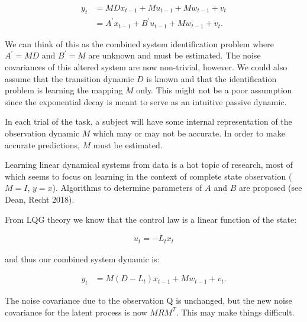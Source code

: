 {            \[
            \begin{align*}
            y_t &= MDx_{t-1} + Mu_{t-1} + Mw_{t-1} + v_t \\
            &= A^\prime x_{t-1} + B^\prime u_{t-1} + Mw_{t-1} + v_t.
            \end{align*}
            \]

            We can think of this as the combined system identification
            problem where \(A^\prime=MD\) and \(B^\prime=M\) are unknown
            and must be estimated. The noise covariances of this altered
            system are now non-trivial, however. We could also assume
            that the transition dynamic \(D\) is known and that the
            identification problem is learning the mapping \(M\) only.
            This might not be a poor assumption since the exponential
            decay is meant to serve as an intuitive passive dynamic.

            In each trial of the task, a subject will have some internal
            representation of the observation dynamic \(M\) which may or
            may not be accurate. In order to make accurate predictions,
            \(M\) must be estimated.

            Learning linear dynamical systems from data is a hot topic
            of research, most of which seems to focus on learning in the
            context of complete state observation (\(M=I\), \(y=x\)).
            Algorithms to determine parameters of \(A\) and \(B\) are
            proposed (see Dean, Recht 2018).

            From LQG theory we know that the control law is a linear
            function of the state:

            \[
            \begin{align*}
            u_t = -L_tx_t
            \end{align*}
            \]

            and thus our combined system dynamic is:

            \[
            \begin{align*}
            y_t &= M(D-L_t)x_{t-1} + Mw_{t-1} + v_t.
            \end{align*}
            \]

            The noise covariance due to the observation Q is unchanged,
            but the new noise covariance for the latent process is now
            \(MRM^T\). This may make things difficult.

}
